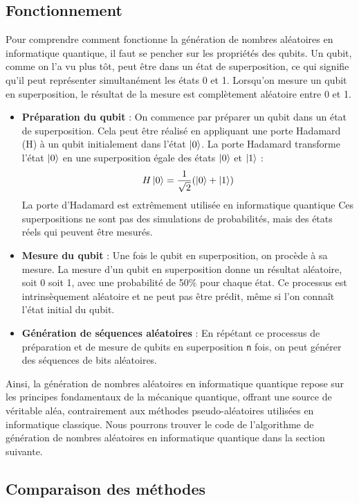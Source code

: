 \documentclass{article}
\begin{document}
\subsection{Fonctionnement}

Pour comprendre comment fonctionne la génération de nombres aléatoires en informatique quantique, il faut se pencher sur les propriétés des qubits. Un qubit, comme on l'a vu plus tôt, peut être dans un état de superposition, ce qui signifie qu'il peut représenter simultanément les états 0 et 1. Lorsqu'on mesure un qubit en superposition, le résultat de la mesure est complètement aléatoire entre 0 et 1.

\begin{itemize}
  \item \textbf{Préparation du qubit} : On commence par préparer un qubit dans un état de superposition. Cela peut être réalisé en appliquant une porte Hadamard (H) à un qubit initialement dans l'état $\ket{0}$. La porte Hadamard transforme l'état $\ket{0}$ en une superposition égale des états $\ket{0}$ et $\ket{1}$ :
  \[
  H\ket{0} = \frac{1}{\sqrt{2}}(\ket{0} + \ket{1})
  \]
  La porte d'Hadamard est extrêmement utilisée en informatique quantique Ces superpositions ne sont pas des simulations de probabilités, mais des états réels qui peuvent être mesurés.
  \item \textbf{Mesure du qubit} : Une fois le qubit en superposition, on procède à sa mesure. La mesure d'un qubit en superposition donne un résultat aléatoire, soit 0 soit 1, avec une probabilité de 50\% pour chaque état. Ce processus est intrinsèquement aléatoire et ne peut pas être prédit, même si l'on connaît l'état initial du qubit.
  \item \textbf{Génération de séquences aléatoires} : En répétant ce processus de préparation et de mesure de qubits en superposition \texttt{n} fois, on peut générer des séquences de bits aléatoires. 
\end{itemize}

Ainsi, la génération de nombres aléatoires en informatique quantique repose sur les principes
fondamentaux de la mécanique quantique, offrant une source de véritable aléa, contrairement
aux méthodes pseudo-aléatoires utilisées en informatique classique. Nous pourrons trouver le code
de l'algorithme de génération de nombres aléatoires en informatique quantique dans la section suivante.


\subsection{Comparaison des méthodes}
\end{document}
